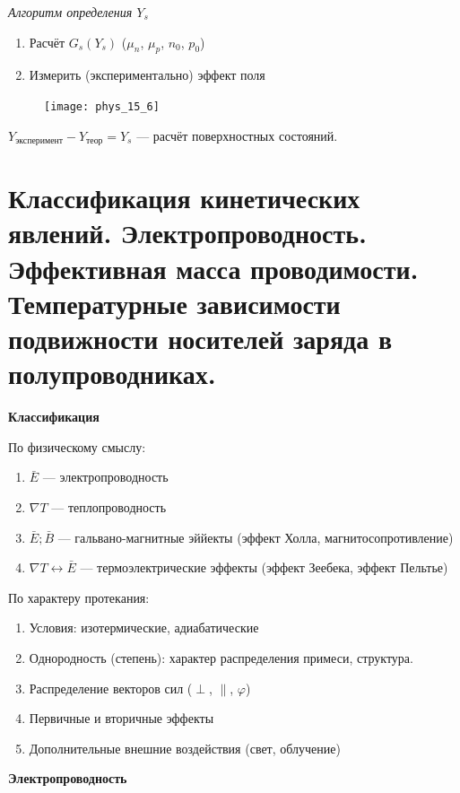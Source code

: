 \textit{Алгоритм определения $Y_s$}

\begin{enumerate}
    \item Расчёт $G_s(Y_s)$ ($\mu_n$, $\mu_p$, $n_0$, $p_0$)
    \item Измерить (экспериментально) эффект поля
\end{enumerate}

\begin{figure}[h!]
    \centering
    \texttt{[image: phys\_15\_6]}
\end{figure}

$Y_\text{эксперимент}-Y_\text{теор}=Y_s$ --- расчёт поверхностных состояний.

\section{Классификация кинетических явлений. Электропроводность. Эффективная масса проводимости. Температурные зависимости подвижности носителей заряда в полупроводниках.}

\textbf{Классификация}

По физическому смыслу:

\begin{enumerate}
    \item $\bar{E}$ --- электропроводность
    \item $\nabla T$ --- теплопроводность
    \item $\bar{E} ; \bar{B}$ --- гальвано-магнитные эййекты (эффект Холла, магнитосопротивление)
    \item $\nabla T \leftrightarrow \bar{E}$ --- термоэлектрические эффекты (эффект Зеебека, эффект Пельтье)
\end{enumerate}

По характеру протекания:

\begin{enumerate}
    \item Условия: изотермические, адиабатические
    \item Однородность (степень): характер распределения примеси, структура.
    \item Распределение векторов сил ($\perp$, $\parallel$, $\varphi$)
    \item Первичные и вторичные эффекты
    \item Дополнительные внешние воздействия (свет, облучение)
\end{enumerate}

\pagebreak
\textbf{Электропроводность}

